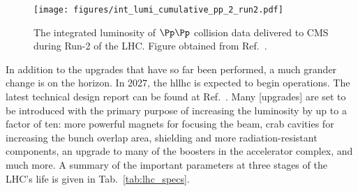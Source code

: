 \begin{figure}[htbp]
    \centering
    \texttt{[image: figures/int\_lumi\_cumulative\_pp\_2\_run2.pdf]}
    \caption[The integrated luminosity of $\Pp\Pp$ collision data delivered to CMS during Run-2 of the LHC]{The integrated luminosity of $\Pp\Pp$ collision data delivered to CMS during Run-2 of the LHC. Figure obtained from Ref.~.}
    \label{fig:detector_cms_lumi}
\end{figure}

In addition to the upgrades that have so far been performed, a much grander change is on the horizon. In 2027, the \acrfull{hllhc} is expected to begin operations. The latest technical design report can be found at Ref.~. Many [upgrades] are set to be introduced with the primary purpose of increasing the luminosity by up to a factor of ten: more powerful magnets for focusing the beam, crab cavities for increasing the bunch overlap area, shielding and more radiation-resistant components, an upgrade to many of the boosters in the accelerator complex, and much more. A summary of the important parameters at three stages of the LHC's life is given in Tab.~\ref{tab:lhc_specs}.

